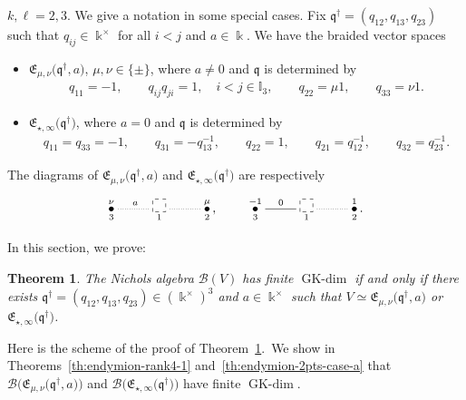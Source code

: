 \documentclass[10pt,a4paper]{amsart}
\numberwithin{equation}{section}
\newtheorem{Theorem}{Theorem}[section]
\newcommand{\GK}{\operatorname{GK-dim}}
\newcommand{\toba}{\mathscr B}
\newcommand{\I}{{\mathbb I}}
\newcommand{\eny}{\mathfrak{E}}
\newcommand{\enyIIb}[1]{\eny_{\star,#1}}
\newcommand{\bq}{\mathfrak{q}}
\newcommand{\bqs}{\bq^{\dagger}}
\begin{document}
$k,\ell = 2,3$.
We give a notation in some special cases. Fix $\bqs = (q_{12}, q_{13}, q_{23})$ such that
$q_{ij} \in \Bbbk^{\times}$ for all $i<j $ and $a \in \Bbbk$.
We have the braided vector spaces
\begin{itemize}\itemsep=0pt
\item $\eny_{\mu, \nu}\big(\bqs, a\big)$, $\mu, \nu \in \{\pm\}$, where $a \neq 0$ and $\bq$ is determined by
\begin{align*}%
q_{11} =-1,\qquad q_{ij}q_{ji} = 1, \quad i<j \in \I_3,\qquad q_{22} =\mu 1,\qquad q_{33} =\nu 1.
\end{align*}

\item$\enyIIb{\infty}\big(\bqs\big)$, where $ a= 0$ and $\bq$ is determined by
\begin{align}\label{eq:bq-IIa-b}
q_{11}= q_{33}=-1, \qquad
q_{3 1} = -q_{13}^{-1},\qquad
q_{22} = 1, \qquad q_{21} = q_{12}^{-1},\qquad
q_{3 2} = q_{23}^{-1}.
\end{align}

\end{itemize}
The diagrams of $\eny_{\mu, \nu}\big(\bqs, a\big)$ and $\enyIIb{\infty}\big(\bqs\big)$ are respectively
$$
\xymatrix{
\overset{\nu}{\underset{3}{\bullet}} \ar@{.}^{a}[r]
&\underset{1}{\begin{tikzpicture}
\draw[dashed] (0,0) rectangle (0.36,0.36);
\end{tikzpicture}} \ar @{.}[r]
& \overset{\mu}{\underset{2}{\bullet}}\,,}\qquad
\xymatrix{
\overset{-1}{\underset{3}{\bullet}} \ar@{-}^{0}[r]
&\underset{1}{\begin{tikzpicture}
\draw[dashed] (0,0) rectangle (0.36,0.36);
\end{tikzpicture}} \ar @{.}[r]
& \overset{1}{\underset{2}{\bullet}}\,.}
$$

In this section, we prove:

\begin{Theorem} \label{th:2-block-points}
The Nichols algebra
$\toba (V)$ has finite $\GK$ if and only if there exists $\bqs = (q_{12}, q_{13}, q_{23}) \in (\Bbbk^{\times})^3$ and $a\in \Bbbk^{\times}$ such that
$V\simeq \eny_{\mu, \nu}\big(\bqs, a\big)$ or $\enyIIb{\infty}\big(\bqs\big)$.
\end{Theorem}

Here is the scheme of the proof of Theorem~\ref{th:2-block-points}.\
We show in Theorems~\ref{th:endymion-rank4-1} and~\ref{th:endymion-2pts-case-a}
that $\toba \big(\eny_{\mu, \nu}\big(\bqs, a\big)\big)$ and
$\toba\big(\enyIIb{\infty}\big(\bqs\big)\big)$ have finite $\GK$.
\end{document}
